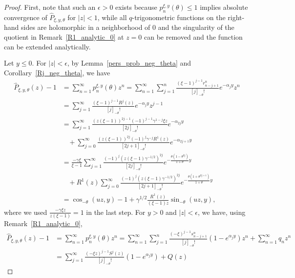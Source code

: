 \documentclass[12pt]{article}
\newcommand{\1}{\mathds{1}}
\theoremstyle{definition}
\theoremstyle{plain}
\theoremstyle{remark}
\begin{document}
\begin{proof}
  First, note that such an $\epsilon>0$ exists because $p_n^{\xi,y}(\theta)\leq1$ implies absolute convergence of $\hat P_{\xi,y,\theta}$ for $|z|<1$, while all $q$-trigonometric functions on the right-hand sides are holomorphic in a neighborhood of $0$ and %
  the singularity of the quotient in Remark~\ref{R1_analytic_0} at $z=0$ can be removed and the function can be extended analytically.
  
  Let $y\le0$. For $|z|<\epsilon$, by Lemma~\ref{pers_prob_neg_theta} and Corollary~\ref{Rj_neg_theta}, we have
  \begin{align*}
     \hat{P}_{\xi,y,\theta}(z)-1
     &=\sum_{n=1}^{\infty}p_n^{\xi,y}(\theta)z^n
     =\sum_{n=1}^{\infty}\sum_{j=1}^n\frac{(\xi-1)^{j-1}r^n_{n-j+1}}{[j]_{-\theta}!}e^{-\alpha_jy}z^n
     \\&=\sum_{j=1}^\infty\frac{(\xi-1)^{j-1}R^j(z)}{[j]_{-\theta}!}e^{-\alpha_jy}z^{j-1}
      \\&=\sum_{j=1}^\infty\frac{(z(\xi-1))^{2j-1}(-1)^{j-1}\gamma^{1-j}\xi z}{[2j]_{-\theta}!}e^{-\alpha_{2j}y}
     \\&~~~~
     +\sum_{j=0}^\infty\frac{(z(\xi-1))^{2j}(-1)^{j}\gamma^{-j}R^1(z)}{[2j+1]_{-\theta}!}e^{-\alpha_{2j+1}y}
     \\&=\frac{-\gamma \xi }{ \xi-1}\sum_{j=1}^\infty\frac{(-1)^{j}(z(\xi-1)\gamma^{-1/2})^{2j}}{[2j]_{-\theta}!}e^{-\frac{\theta(1-\theta^{2j})}{1+\theta}y}
     \\&~~~~+R^1(z)\sum_{j=0}^\infty\frac{(-1)^{j}(z(\xi-1)\gamma^{-1/2})^{2j}}{[2j+1]_{-\theta}!}e^{-\frac{\theta(1+\theta^{2j+1})}{1+\theta}y}
      \\&=\cos_{-\theta}(uz,y)-1
     +\gamma^{1/2}\frac{R^1(z)}{(\xi-1)z}\sin_{-\theta}(uz,y),
  \end{align*}
  where we used $\frac{-\gamma \xi z}{ z(\xi-1)}=1$ in the last step.  For $y>0$ and  $|z|<\epsilon$, we have, using Remark~\ref{R1_analytic_0},
   \begin{align*}
     \hat{P}_{\xi,y,\theta}(z)-1
     &=\sum_{n=1}^{\infty}p_n^{\xi,y}(\theta)z^n
     =\sum_{n=1}^{\infty}\sum_{j=1}^n\frac{(-\xi)^{j-1}s^n_{n-j+1}}{[j]_{-\theta}!}(1-e^{\alpha_jy})z^n+\sum_{n=1}^{\infty}q_nz^n
     \\&=\sum_{j=1}^\infty\frac{(-\xi z)^{j-1}S^j(z)}{[j]_{-\theta}!}(1-e^{\alpha_jy})+Q(z)

\end{align*}
\end{proof}
\end{document}
